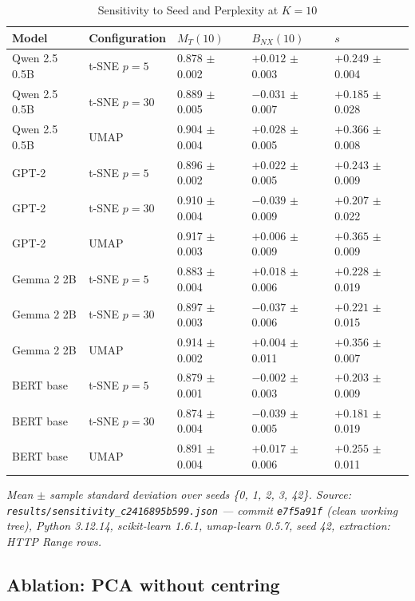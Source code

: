 \documentclass[conference,a4paper]{IEEEtran}
\begin{document}
\begin{table}[tp]
\centering
\caption{Sensitivity to Seed and Perplexity at $K = 10$}\label{tab:sensitivity}
\footnotesize
\begin{tabular*}{\textwidth}{@{\extracolsep{\fill}}lllll@{}}
\toprule
Model & Configuration & $M_T(10)$ & $B_{NX}(10)$ & $s$ \\
\midrule
Qwen 2.5 0.5B & t-SNE $p=5$ & 0.878 $\pm$ 0.002 & $+0.012$ $\pm$ 0.003 & $+0.249$ $\pm$ 0.004 \\
Qwen 2.5 0.5B & t-SNE $p=30$ & 0.889 $\pm$ 0.005 & $-0.031$ $\pm$ 0.007 & $+0.185$ $\pm$ 0.028 \\
Qwen 2.5 0.5B & UMAP & 0.904 $\pm$ 0.004 & $+0.028$ $\pm$ 0.005 & $+0.366$ $\pm$ 0.008 \\
GPT-2 & t-SNE $p=5$ & 0.896 $\pm$ 0.002 & $+0.022$ $\pm$ 0.005 & $+0.243$ $\pm$ 0.009 \\
GPT-2 & t-SNE $p=30$ & 0.910 $\pm$ 0.004 & $-0.039$ $\pm$ 0.009 & $+0.207$ $\pm$ 0.022 \\
GPT-2 & UMAP & 0.917 $\pm$ 0.003 & $+0.006$ $\pm$ 0.009 & $+0.365$ $\pm$ 0.009 \\
Gemma 2 2B & t-SNE $p=5$ & 0.883 $\pm$ 0.004 & $+0.018$ $\pm$ 0.006 & $+0.228$ $\pm$ 0.019 \\
Gemma 2 2B & t-SNE $p=30$ & 0.897 $\pm$ 0.003 & $-0.037$ $\pm$ 0.006 & $+0.221$ $\pm$ 0.015 \\
Gemma 2 2B & UMAP & 0.914 $\pm$ 0.002 & $+0.004$ $\pm$ 0.011 & $+0.356$ $\pm$ 0.007 \\
BERT base & t-SNE $p=5$ & 0.879 $\pm$ 0.001 & $-0.002$ $\pm$ 0.003 & $+0.203$ $\pm$ 0.009 \\
BERT base & t-SNE $p=30$ & 0.874 $\pm$ 0.004 & $-0.039$ $\pm$ 0.005 & $+0.181$ $\pm$ 0.019 \\
BERT base & UMAP & 0.891 $\pm$ 0.004 & $+0.017$ $\pm$ 0.006 & $+0.255$ $\pm$ 0.011 \\
\bottomrule
\end{tabular*}
\par\vspace{3pt}\parbox{\textwidth}{\scriptsize \emph{Mean $\pm$ sample standard deviation over seeds \{0, 1, 2, 3, 42\}. Source: \texttt{results/sensitivity\_c2416895b599.json} --- commit \texttt{e7f5a91f} (clean working tree), Python 3.12.14, scikit-learn 1.6.1, umap-learn 0.5.7, seed 42, extraction: HTTP Range rows.}}
\end{table}

\subsection{Ablation: PCA without centring}\label{sec:ablation-pca-without}
\end{document}
